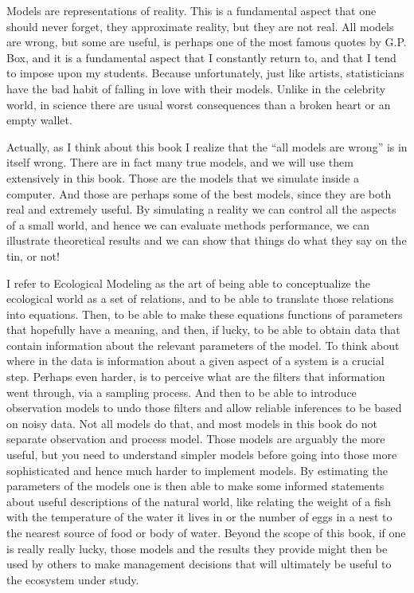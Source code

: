\documentclass[
]{book}
\begin{document}
Models are representations of reality. This is a fundamental aspect that one should never forget, they approximate reality, but they are not real. All models are wrong, but some are useful, is perhaps one of the most famous quotes by G.P. Box, and it is a fundamental aspect that I constantly return to, and that I tend to impose upon my students. Because unfortunately, just like artists, statisticians have the bad habit of falling in love with their models. Unlike in the celebrity world, in science there are usual worst consequences than a broken heart or an empty wallet.

Actually, as I think about this book I realize that the ``all models are wrong'' is in itself wrong. There are in fact many true models, and we will use them extensively in this book. Those are the models that we simulate inside a computer. And those are perhaps some of the best models, since they are both real and extremely useful. By simulating a reality we can control all the aspects of a small world, and hence we can evaluate methods performance, we can illustrate theoretical results and we can show that things do what they say on the tin, or not!

I refer to Ecological Modeling as the art of being able to conceptualize the ecological world as a set of relations, and to be able to translate those relations into equations. Then, to be able to make these equations functions of parameters that hopefully have a meaning, and then, if lucky, to be able to obtain data that contain information about the relevant parameters of the model. To think about where in the data is information about a given aspect of a system is a crucial step. Perhaps even harder, is to perceive what are the filters that information went through, via a sampling process. And then to be able to introduce observation models to undo those filters and allow reliable inferences to be based on noisy data. Not all models do that, and most models in this book do not separate observation and process model. Those models are arguably the more useful, but you need to understand simpler models before going into those more sophisticated and hence much harder to implement models. By estimating the parameters of the models one is then able to make some informed statements about useful descriptions of the natural world, like relating the weight of a fish with the temperature of the water it lives in or the number of eggs in a nest to the nearest source of food or body of water. Beyond the scope of this book, if one is really really lucky, those models and the results they provide might then be used by others to make management decisions that will ultimately be useful to the ecosystem under study.
\end{document}
